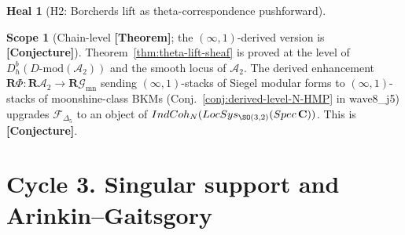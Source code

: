 \documentclass[11pt]{amsart}
\theoremstyle{definition}
\newtheorem{heal}[attack]{Heal}
\newtheorem{scope}[theorem]{Scope}
\providecommand{\IndCoh}{\mathrm{IndCoh}}
\providecommand{\DMod}{D\text{-}\mathrm{mod}}
\providecommand{\LocSys}{\mathrm{LocSys}}
\providecommand{\cA}{\mathcal{A}}
\providecommand{\cF}{\mathcal{F}}
\providecommand{\bC}{\mathbf{C}}
\providecommand{\bR}{\mathbf{R}}
\providecommand{\Dfive}{\Delta_5}
\providecommand{\ClaimStatusConjectured}{\textbf{[Conjecture]}}
\begin{document}
\begin{heal}[H2: Borcherds lift as theta-correspondence pushforward]
\begin{scope}[Chain-level \textbf{[Theorem]}; the $(\infty, 1)$-derived
version is \textbf{[Conjecture]}]\label{scope:bruinier-deriv}
Theorem~\ref{thm:theta-lift-sheaf} is proved at the level of
$D^b_h(\DMod(\mathcal{A}_2))$ and the smooth locus of
$\mathcal{A}_2$. The derived enhancement
$\bR\Phi \colon \bR\cA_2 \to \bR\mathcal{G}_{\mathrm{mn}}$ sending
$(\infty, 1)$-stacks of Siegel modular forms to
$(\infty, 1)$-stacks of moonshine-class BKMs (Conj.~\ref{conj:derived-level-N-HMP}
in wave8\_j5) upgrades $\cF_{\Dfive}$ to an object of
$\IndCoh_{\cN}(\LocSys_{\SO(3,2)}(\mathrm{Spec}\,\bC))$. This is
\ClaimStatusConjectured.
\end{scope}
\end{heal}

\section{Cycle 3. Singular support and Arinkin--Gaitsgory}
\end{document}
